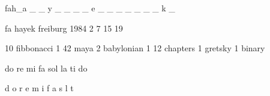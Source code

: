 fah_a _ _ y _ _ _ _ e _ _ _ _ _ _ _ k _




fa hayek freiburg 1984
2 7 15 19

10 fibbonacci
1 42 maya
2 babylonian
1 12 chapters
1 gretsky
1 binary

do re mi fa sol la ti do

d
o
r
e
m
i
f
a
s
l
t

